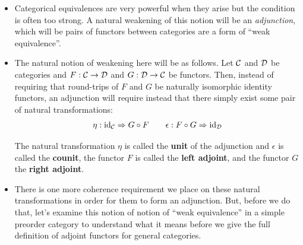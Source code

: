 \begin{itemize}
  Now, show that there is a natural isomorphism $\alpha : F \circ G \Rightarrow \id_{\textsf{FinSet}^*}$.
  This is not too hard and a good exercise. 
  It requires showing that there is a $\mathsf{FinSet}^*$ isomorphism 
  $(X, a) \cong ((X \setminus a) \uplus \star, \star)$. 

  \item Categorical equivalences are very powerful when they arise but 
  the condition is often too strong. 
  A natural weakening of this notion will be an \emph{adjunction}, which will be pairs of 
  functors between categories are a form of ``weak equivalence''. 

  \item The natural notion of weakening here will be as follows. Let $\mathcal C$ and $\mathcal D$ 
  be categories and $F : \mathcal C \to \mathcal D$ and $G : \mathcal D \to \mathcal C$ be functors. 
  Then, instead of requiring that round-trips of $F$ and $G$ be naturally isomorphic identity functors, 
  an adjunction will require instead that there simply exist some pair of natural transformations:
  \begin{align}
    \eta : \operatorname{id}_\mathcal C \Rightarrow G \circ F  \qquad
    \epsilon :  F \circ G \Rightarrow \operatorname{id}_\mathcal D 
    \label{eq:adjoint-units}
  \end{align}

  The natural transformation $\eta$ is called the \textbf{unit} of the adjunction and 
  $\epsilon$ is called the \textbf{counit}, the functor $F$ is called 
  the \textbf{left adjoint}, and the functor $G$ the \textbf{right adjoint}.

  \item There is one more coherence requirement we place on these natural
  transformations in order for them to form an adjunction. But, before we do
  that, let's examine this notion of notion of ``weak equivalence'' in a 
  simple preorder category to understand what it means before we give the 
  full definition of adjoint functors for general categories.
\end{itemize}

